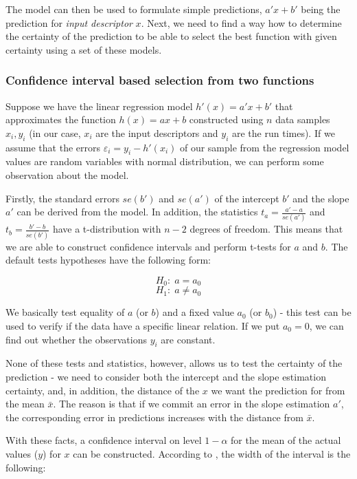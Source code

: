 The model can then be used to formulate simple predictions, $a'x + b'$ being the prediction for \textit{input descriptor} $x$. Next, we need to find a way how to determine the certainty of the prediction to be able to select the best function with given certainty using a set of these models.

\subsubsection{Confidence interval based selection from two functions}
\label{subsubsec:confidence_interval_selection}

Suppose we have the linear regression model \(h'(x) = a' x + b'\) that approximates the function $h(x) = ax + b$ constructed using \(n\) data samples \(x_i, y_i\) (in our case, \(x_i\) are the input descriptors and \(y_i\) are the run times). If we assume that the errors $\varepsilon_i = y_i - h'(x_i)$ of our sample from the regression model values are random variables with normal distribution, we can perform some observation about the model.

Firstly, the standard errors $se(b')$ and $se(a')$ of the intercept $b'$ and the slope $a'$ can be derived from the model. In addition, the statistics $t_a = \frac{a' - a}{se(a')}$ and $t_b = \frac{b' - b}{se(b')}$ have a t-distribution with $n-2$ degrees of freedom. This means that we are able to construct confidence intervals and perform t-tests for $a$ and $b$. The default tests hypotheses have the following form:

\[H_0:\; a = a_0\]
\[H_1:\; a \neq a_0 \]

We basically test equality of $a$ (or $b$) and a fixed value $a_0$ (or $b_0$) - this test can be used to verify if the data have a specific linear relation. If we put $a_0 = 0$, we can find out whether the observations $y_i$ are constant. 

None of these tests and statistics, however, allows us to test the certainty of the prediction - we need to consider both the intercept and the slope estimation certainty, and, in addition, the distance of the $x$ we want the prediction for from the mean $\bar{x}$. The reason is that if we commit an error in the slope estimation $a'$, the corresponding error in predictions increases with the distance from $\bar{x}$. 

With these facts, a confidence interval on level $1 - \alpha$ for the mean of the actual values ($y$) for $x$ can be constructed. According to \cite{weiss_introductory_2010}, the width of the interval is the following:

